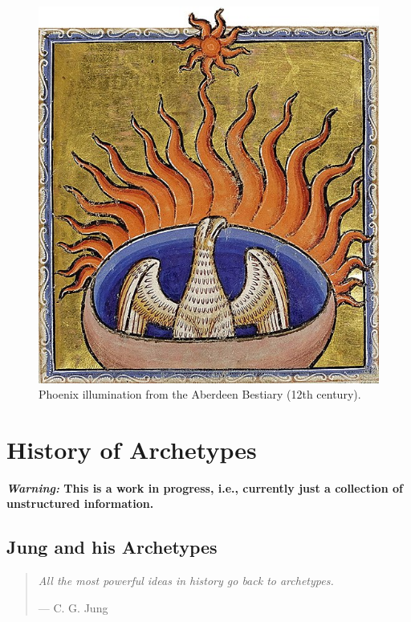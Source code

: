 \documentclass[
]{book}
\begin{document}
\begin{figure}

{\centering \includegraphics[width=\textwidth]{img/phoenix_aberdeen_bestiary} 

}

\caption{Phoenix illumination from the Aberdeen Bestiary (12th century).}\label{fig:unnamed-chunk-5}
\end{figure}

\hypertarget{history-of-archetypes}{%
\chapter{History of Archetypes}\label{history-of-archetypes}}

\textbf{\emph{Warning:} This is a work in progress, i.e., currently just a collection of unstructured information.}

\hypertarget{jung-and-his-archetypes}{%
\section{Jung and his Archetypes}\label{jung-and-his-archetypes}}

\begin{quote}
\emph{All the most powerful ideas in history go back to archetypes.}

\hfill --- C. G. Jung
\end{quote}
\end{document}

